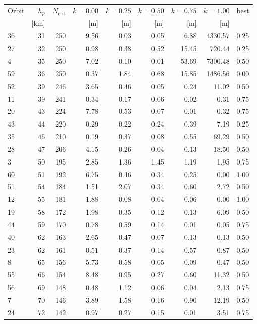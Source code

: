\begin{tabular}{@{}l r r r r r r r l@{}}
\toprule
Orbit & $h_p$ & $N_{\mathrm{crit}}$ & $k{=}0.00$ & $k{=}0.25$ & $k{=}0.50$ & $k{=}0.75$ & $k{=}1.00$ & best \\
 & [km] & & [m] & [m] & [m] & [m] & [m] & \\
\midrule
36 & 31 & 250 & 9.56 & 0.03 & 0.05 & 6.88 & 4330.57 & 0.25 \\
27 & 32 & 250 & 0.98 & 0.38 & 0.52 & 15.45 & 720.44 & 0.25 \\
4 & 35 & 250 & 7.02 & 0.10 & 0.01 & 53.69 & 7300.48 & 0.50 \\
59 & 36 & 250 & 0.37 & 1.84 & 0.68 & 15.85 & 1486.56 & 0.00 \\
52 & 39 & 246 & 3.65 & 0.46 & 0.05 & 0.24 & 11.02 & 0.50 \\
11 & 39 & 241 & 0.34 & 0.17 & 0.06 & 0.02 & 0.31 & 0.75 \\
20 & 43 & 224 & 7.78 & 0.53 & 0.07 & 0.01 & 0.32 & 0.75 \\
43 & 44 & 220 & 0.29 & 0.22 & 0.24 & 0.39 & 7.19 & 0.25 \\
35 & 46 & 210 & 0.19 & 0.37 & 0.08 & 0.55 & 69.29 & 0.50 \\
28 & 47 & 206 & 4.15 & 0.26 & 0.04 & 0.13 & 18.50 & 0.50 \\
3 & 50 & 195 & 2.85 & 1.36 & 1.45 & 1.19 & 1.95 & 0.75 \\
60 & 51 & 192 & 6.75 & 0.46 & 0.34 & 0.25 & 0.00 & 1.00 \\
51 & 54 & 184 & 1.51 & 2.07 & 0.34 & 0.60 & 2.72 & 0.50 \\
12 & 55 & 181 & 1.88 & 0.08 & 0.04 & 0.06 & 0.00 & 1.00 \\
19 & 58 & 172 & 1.98 & 0.35 & 0.12 & 0.13 & 6.09 & 0.50 \\
44 & 59 & 170 & 0.78 & 0.59 & 0.14 & 0.01 & 0.05 & 0.75 \\
40 & 62 & 163 & 2.65 & 0.47 & 0.07 & 0.13 & 0.13 & 0.50 \\
23 & 62 & 161 & 0.51 & 0.37 & 0.14 & 0.57 & 0.87 & 0.50 \\
8 & 65 & 156 & 5.73 & 0.58 & 0.05 & 0.09 & 0.47 & 0.50 \\
55 & 66 & 154 & 8.48 & 0.95 & 0.27 & 0.60 & 11.32 & 0.50 \\
56 & 69 & 148 & 0.48 & 1.12 & 0.06 & 0.04 & 2.13 & 0.75 \\
7 & 70 & 146 & 3.89 & 1.58 & 0.16 & 0.90 & 12.19 & 0.50 \\
24 & 72 & 142 & 0.97 & 0.27 & 0.15 & 0.01 & 3.51 & 0.75 \\

\end{tabular}
